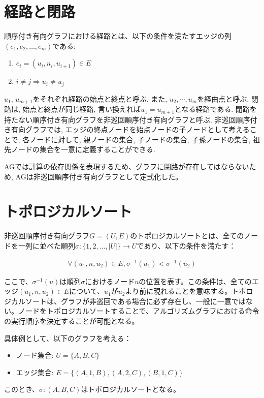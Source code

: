 \documentclass[11pt,oneside,openany,report]{jsbook}
\begin{document}
\section{経路と閉路}
順序付き有向グラフにおける経路とは、以下の条件を満たすエッジの列$(e_1, e_2, \ldots, e_m)$である:
\begin{enumerate}
  \item $e_i = (u_i, n_i, u_{i+1}) \in E$
  \item $i \neq j \Rightarrow u_i \neq u_j$
\end{enumerate}
\noindent
$u_1$, $u_{m+1}$をそれぞれ経路の始点と終点と呼ぶ. また, $u_2, \cdots, u_m$を経由点と呼ぶ. 閉路は, 始点と終点が同じ経路, 言い換えれば$u_1 = u_{m+1}$となる経路である. 閉路を持たない順序付き有向グラフを非巡回順序付き有向グラフと呼ぶ. 非巡回順序付き有向グラフでは, エッジの終点ノードを始点ノードの子ノードとして考えることで, 各ノードに対して, 親ノードの集合, 子ノードの集合, 子孫ノードの集合, 祖先ノードの集合を一意に定義することができる.

AGでは計算の依存関係を表現するため、グラフに閉路が存在してはならないため, AGは非巡回順序付き有向グラフとして定式化した。

\section{トポロジカルソート}
非巡回順序付き有向グラフ$G = (U, E)$のトポロジカルソートとは、全てのノードを一列に並べた順列$\sigma: \{1,2,\ldots,|U|\} \rightarrow U$であり、以下の条件を満たす：

\begin{gather*}
\forall (u_1, n, u_2) \in E, \sigma^{-1}(u_1) < \sigma^{-1}(u_2)
\end{gather*}

ここで、$\sigma^{-1}(u)$は順列$\sigma$におけるノード$u$の位置を表す。この条件は、全てのエッジ$(u_1,n,u_2) \in E$について、$u_1$が$u_2$より前に現れることを意味する。トポロジカルソートは、グラフが非巡回である場合に必ず存在し、一般に一意ではない。ノードをトポロジカルソートすることで、アルゴリズムグラフにおける命令の実行順序を決定することが可能となる。

具体例として、以下のグラフを考える：
\begin{itemize}
   \item ノード集合: $U = \{A, B, C\}$
   \item エッジ集合: $E = \{(A,1,B), (A,2,C), (B,1,C)\}$
\end{itemize}
\noindent
このとき、$\sigma: (A,B,C)$はトポロジカルソートとなる。
\end{document}
